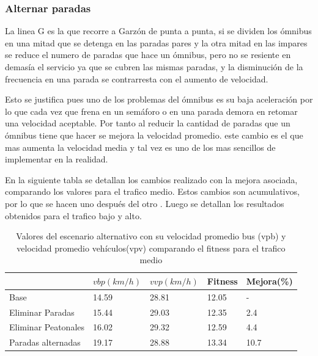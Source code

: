 \subsubsection{Alternar paradas}

La linea G es la que recorre a Garzón de punta a punta, si se dividen los ómnibus en una mitad que se detenga en las paradas pares y la otra mitad en las impares se reduce el numero de paradas que hace un ómnibus, pero no se resiente en demasía el servicio ya que se cubren las mismas paradas, y la disminución de la frecuencia en una parada se contrarresta con el aumento de velocidad.

Esto se justifica pues uno de los problemas del ómnibus es su baja aceleración por lo que cada vez que frena en un semáforo o en una parada demora en retomar una velocidad aceptable. Por tanto al reducir la cantidad de paradas que un ómnibus tiene que hacer se mejora la velocidad promedio.
este cambio es el que mas aumenta la velocidad media y tal vez es uno de los mas sencillos de implementar en la realidad.



En la siguiente tabla se detallan los cambios realizado con la mejora asociada, comparando los valores para el trafico medio. Estos cambios son acumulativos, por lo que se hacen uno después del otro . Luego se detallan los resultados obtenidos para el trafico bajo y alto.


\begin{table}[h]
	\renewcommand{\arraystretch}{1.2}
	\caption{Valores del escenario alternativo con su velocidad promedio bus (vpb) y velocidad promedio vehículos(vpv) comparando el fitness para el trafico medio }
	\label{table:resultado_alternativo}
	\centering
	\begin{tabular}{p{3.5cm}p{2.5cm}p{2.5cm}p{2cm}p{2cm} }
		\hline
		&
		$vbp(km/h)$& 
		$vvp(km/h)$ & 
		Fitness &
		Mejora(\%)
		\\ 
		\hline
		Base & 14.59  & 28.81& 12.05 & -\\
		Eliminar Paradas & 15.44  & 29.03& 12.35 & 2.4\\
		Eliminar Peatonales  & 16.02  & 29.32& 12.59 & 4.4\\
		Paradas alternadas  & 19.17  & 28.88& 13.34 & 10.7\\		
		\hline
	\end{tabular}
\end{table}




